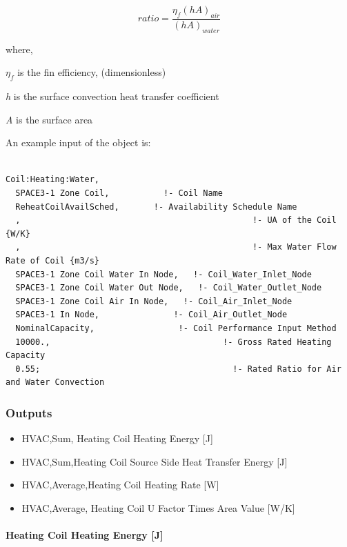\begin{equation}
ratio = \frac{{{\eta_f}{{\left( {hA} \right)}_{air}}}}{{{{\left( {hA} \right)}_{water}}}}
\end{equation}

where,

\({\eta_f}\) is the fin efficiency, (dimensionless)

\emph{h} is the surface convection heat transfer coefficient

\emph{A} is the surface area

An example input of the object is:

\begin{lstlisting}

Coil:Heating:Water,
  SPACE3-1 Zone Coil,           !- Coil Name
  ReheatCoilAvailSched,       !- Availability Schedule Name
  ,                                               !- UA of the Coil {W/K}
  ,                                               !- Max Water Flow Rate of Coil {m3/s}
  SPACE3-1 Zone Coil Water In Node,   !- Coil_Water_Inlet_Node
  SPACE3-1 Zone Coil Water Out Node,   !- Coil_Water_Outlet_Node
  SPACE3-1 Zone Coil Air In Node,   !- Coil_Air_Inlet_Node
  SPACE3-1 In Node,               !- Coil_Air_Outlet_Node
  NominalCapacity,                 !- Coil Performance Input Method
  10000.,                                   !- Gross Rated Heating Capacity
  0.55;                                       !- Rated Ratio for Air and Water Convection
\end{lstlisting}

\subsubsection{Outputs}\label{outputs-1-013}

\begin{itemize}
\item
  HVAC,Sum, Heating Coil Heating Energy {[}J{]}
\item
  HVAC,Sum,Heating Coil Source Side Heat Transfer Energy {[}J{]}
\item
  HVAC,Average,Heating Coil Heating Rate {[}W{]}
\item
  HVAC,Average, Heating Coil U Factor Times Area Value {[}W/K{]}
\end{itemize}

\paragraph{Heating Coil Heating Energy {[}J{]}}\label{heating-coil-heating-energy-j}

